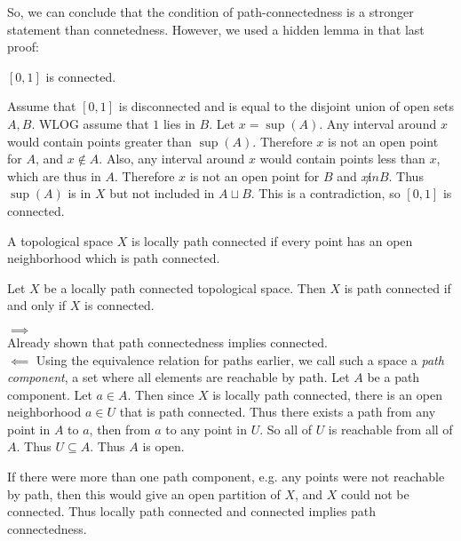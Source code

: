 \documentclass{article}
\begin{document}
\vspace{1em}

So, we can conclude that the condition of path-connectedness is a stronger statement than connetedness. However, we used a hidden lemma in that last proof:
\begin{proposition}
    $[0,1]$ is connected.
\end{proposition}
\pf Assume that $[0,1]$ is disconnected and is equal to the disjoint union of open sets $A,B$. WLOG assume that $1$ lies in $B$.
Let $x = \sup(A)$. Any interval around $x$ would contain points greater than $\sup(A)$. Therefore $x$ is not an open point for $A$, and $x \not \in A$. Also, any 
interval around $x$ would contain points less than $x$, which are thus in $A$. Therefore $x$ is not an open point for $B$ and $x \not in B$.
Thus $\sup(A)$ is in $X$ but not included in $A\sqcup B$. This is a contradiction, so $[0,1]$ is connected.
\vspace{1em}

\begin{definition}
    A topological space $X$ is locally path connected if every point has an open neighborhood which is path connected.
\end{definition}

\begin{theorem}
    Let $X$ be a locally path connected topological space. Then $X$ is path connected if and only if 
    $X$ is connected.
\end{theorem}
\pf
$\mathbf{\implies}$ \\
Already shown that path connectedness implies connected. \\

$\mathbf{\impliedby}$
Using the equivalence relation for paths earlier, we call such a space a
\emph{path component}, a set where all elements are reachable by path. Let $A$ be a path component.
Let $a \in A$. Then since $X$ is locally path connected, there is an open neighborhood $a \in U$ that is path connected.
Thus there exists a path from any point in $A$ to $a$, then from $a$ to any point in $U$. So all of $U$ is reachable from all of
$A$. Thus $U \subseteq A$. Thus $A$ is open.
\vspace{0.5em}

If there were more than one path component, e.g. any points were not reachable by path, then this would give an open partition of $X$, and $X$
could not be connected. Thus locally path connected and connected implies path connectedness. \done
\end{document}
